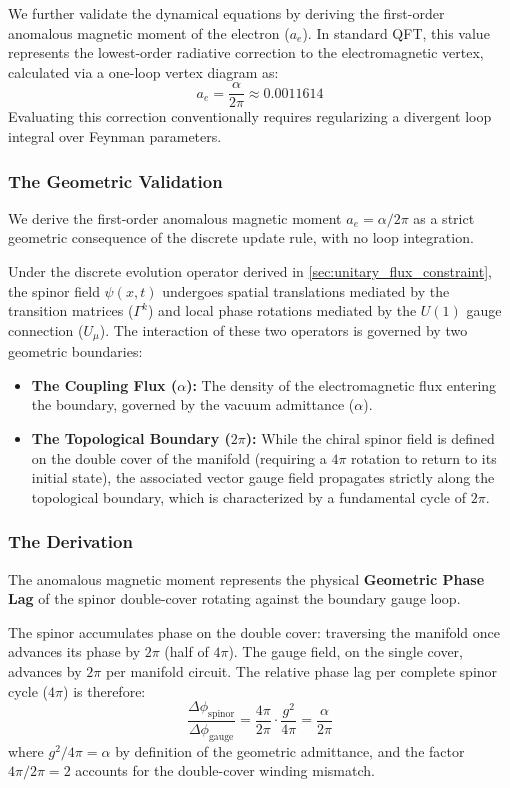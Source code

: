 We further validate the dynamical equations by deriving the first-order anomalous magnetic moment of the electron ($a_e$). In standard QFT, this value represents the lowest-order radiative correction to the electromagnetic vertex, calculated via a one-loop vertex diagram as:
\begin{equation}
a_e = \frac{\alpha}{2\pi} \approx 0.0011614
\end{equation}
Evaluating this correction conventionally requires regularizing a divergent loop integral over Feynman parameters. 

\subsubsection{The Geometric Validation}

We derive the first-order anomalous magnetic moment $a_e = \alpha/2\pi$ as a strict geometric consequence of the discrete update rule, with no loop integration.

Under the discrete evolution operator derived in \cref{sec:unitary_flux_constraint}, the spinor field $\psi(x,t)$ undergoes spatial translations mediated by the transition matrices ($\Gamma^k$) and local phase rotations mediated by the $U(1)$ gauge connection ($U_\mu$). The interaction of these two operators is governed by two geometric boundaries:
\begin{itemize}
    \item \textbf{The Coupling Flux ($\alpha$):} The density of the electromagnetic flux entering the boundary, governed by the vacuum admittance ($\alpha$).
    \item \textbf{The Topological Boundary ($2\pi$):} While the chiral spinor field is defined on the double cover of the manifold (requiring a $4\pi$ rotation to return to its initial state), the associated vector gauge field propagates strictly along the topological boundary, which is characterized by a fundamental cycle of $2\pi$.
\end{itemize}

\subsubsection{The Derivation}

The anomalous magnetic moment represents the physical \textbf{Geometric Phase Lag} of the spinor double-cover rotating against the boundary gauge loop. 

The spinor accumulates phase on the double cover: traversing the manifold once advances its phase by $2\pi$ (half of $4\pi$). The gauge field, on the single cover, advances by $2\pi$ per manifold circuit. The relative phase lag per complete spinor cycle ($4\pi$) is therefore:
\begin{equation}
\frac{\Delta\phi_{\text{spinor}}}{\Delta\phi_{\text{gauge}}} = \frac{4\pi}{2\pi} \cdot \frac{g^2}{4\pi} = \frac{\alpha}{2\pi}
\end{equation}
where $g^2/4\pi = \alpha$ by definition of the geometric admittance, and the factor $4\pi/2\pi = 2$ accounts for the double-cover winding mismatch.

